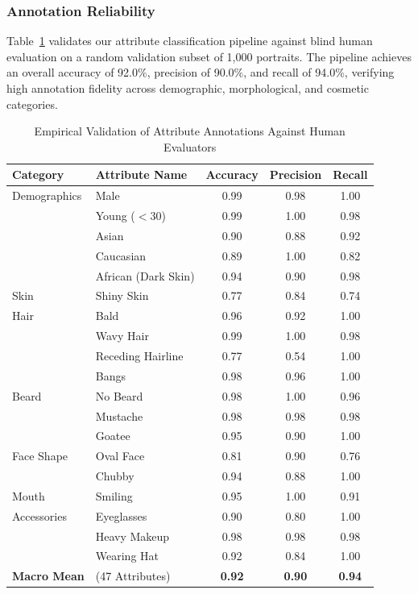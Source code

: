 \documentclass[journal]{IEEEtran}
\begin{document}
\subsubsection{Annotation Reliability}
Table~\ref{tab:annotation_correctness} validates our attribute classification pipeline against blind human evaluation on a random validation subset of 1,000 portraits. The pipeline achieves an overall accuracy of 92.0\%, precision of 90.0\%, and recall of 94.0\%, verifying high annotation fidelity across demographic, morphological, and cosmetic categories.

\begin{table}[t]
\caption{Empirical Validation of Attribute Annotations Against Human Evaluators}
\label{tab:annotation_correctness}
\centering
\renewcommand{\arraystretch}{1.1}
\setlength{\tabcolsep}{4.5pt}
\begin{tabular}{llccc}
\toprule
\textbf{Category} & \textbf{Attribute Name} & \textbf{Accuracy} & \textbf{Precision} & \textbf{Recall} \\
\midrule
Demographics & Male & 0.99 & 0.98 & 1.00 \\
             & Young ($<30$) & 0.99 & 1.00 & 0.98 \\
             & Asian & 0.90 & 0.88 & 0.92 \\
             & Caucasian & 0.89 & 1.00 & 0.82 \\
             & African (Dark Skin) & 0.94 & 0.90 & 0.98 \\
Skin         & Shiny Skin & 0.77 & 0.84 & 0.74 \\
Hair         & Bald & 0.96 & 0.92 & 1.00 \\
             & Wavy Hair & 0.99 & 1.00 & 0.98 \\
             & Receding Hairline & 0.77 & 0.54 & 1.00 \\
             & Bangs & 0.98 & 0.96 & 1.00 \\
Beard        & No Beard & 0.98 & 1.00 & 0.96 \\
             & Mustache & 0.98 & 0.98 & 0.98 \\
             & Goatee & 0.95 & 0.90 & 1.00 \\
Face Shape   & Oval Face & 0.81 & 0.90 & 0.76 \\
             & Chubby & 0.94 & 0.88 & 1.00 \\
Mouth        & Smiling & 0.95 & 1.00 & 0.91 \\
Accessories  & Eyeglasses & 0.90 & 0.80 & 1.00 \\
             & Heavy Makeup & 0.98 & 0.98 & 0.98 \\
             & Wearing Hat & 0.92 & 0.84 & 1.00 \\
\midrule
\textbf{Macro Mean} & (47 Attributes) & \textbf{0.92} & \textbf{0.90} & \textbf{0.94} \\
\bottomrule
\end{tabular}
\end{table}
\end{document}
